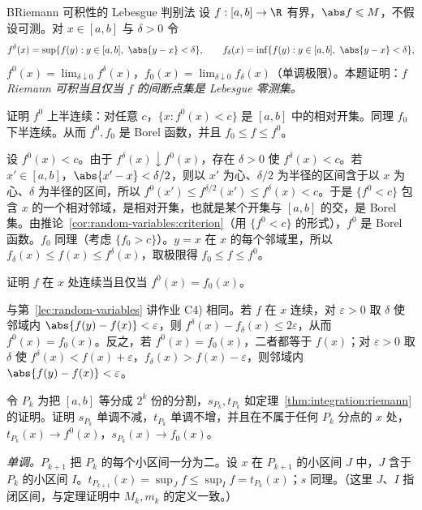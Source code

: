 \begin{probleme}{B}{Riemann 可积性的 Lebesgue 判别法}
设 $f:[a,b]\to\R$ 有界，$\abs f\leqslant M$，不假设可测。对 $x\in[a,b]$ 与 $\delta>0$ 令
\[
f^\delta(x)=\sup\{f(y):y\in[a,b],\ \abs{y-x}<\delta\},\qquad f_\delta(x)=\inf\{f(y):y\in[a,b],\ \abs{y-x}<\delta\},
\]
$f^0(x)=\lim_{\delta\downarrow0}f^\delta(x)$，$f_0(x)=\lim_{\delta\downarrow0}f_\delta(x)$（单调极限）。本题证明：\emph{$f$ Riemann 可积当且仅当 $f$ 的间断点集是 Lebesgue 零测集。}
\begin{questions}
\item 证明 $f^0$ 上半连续：对任意 $c$，$\{x:f^0(x)<c\}$ 是 $[a,b]$ 中的相对开集。同理 $f_0$ 下半连续。从而 $f^0,f_0$ 是 Borel 函数，并且 $f_0\leqslant f\leqslant f^0$。
\begin{solution}
设 $f^0(x)<c$。由于 $f^\delta(x)\downarrow f^0(x)$，存在 $\delta>0$ 使 $f^\delta(x)<c$。若 $x'\in[a,b]$，$\abs{x'-x}<\delta/2$，则以 $x'$ 为心、$\delta/2$ 为半径的区间含于以 $x$ 为心、$\delta$ 为半径的区间，所以 $f^0(x')\leqslant f^{\delta/2}(x')\leqslant f^\delta(x)<c$。于是 $\{f^0<c\}$ 包含 $x$ 的一个相对邻域，是相对开集，也就是某个开集与 $[a,b]$ 的交，是 Borel 集。由推论~\ref{cor:random-variables:criterion}（用 $\{f^0<c\}$ 的形式），$f^0$ 是 Borel 函数。$f_0$ 同理（考虑 $\{f_0>c\}$）。$y=x$ 在 $x$ 的每个邻域里，所以 $f_\delta(x)\leqslant f(x)\leqslant f^\delta(x)$，取极限得 $f_0\leqslant f\leqslant f^0$。
\end{solution}
\item 证明 $f$ 在 $x$ 处连续当且仅当 $f^0(x)=f_0(x)$。
\begin{solution}
与第~\ref{lec:random-variables} 讲作业 C4) 相同。若 $f$ 在 $x$ 连续，对 $\varepsilon>0$ 取 $\delta$ 使邻域内 $\abs{f(y)-f(x)}<\varepsilon$，则 $f^\delta(x)-f_\delta(x)\leqslant2\varepsilon$，从而 $f^0(x)=f_0(x)$。反之，若 $f^0(x)=f_0(x)$，二者都等于 $f(x)$；对 $\varepsilon>0$ 取 $\delta$ 使 $f^\delta(x)<f(x)+\varepsilon$，$f_\delta(x)>f(x)-\varepsilon$，则邻域内 $\abs{f(y)-f(x)}<\varepsilon$。
\end{solution}
\item 令 $P_k$ 为把 $[a,b]$ 等分成 $2^k$ 份的分割，$s_{P_k},t_{P_k}$ 如定理~\ref{thm:integration:riemann} 的证明。证明 $s_{P_k}$ 单调不减，$t_{P_k}$ 单调不增，并且在不属于任何 $P_k$ 分点的 $x$ 处，$t_{P_k}(x)\to f^0(x)$，$s_{P_k}(x)\to f_0(x)$。
\begin{solution}
\emph{单调。}$P_{k+1}$ 把 $P_k$ 的每个小区间一分为二。设 $x$ 在 $P_{k+1}$ 的小区间 $J$ 中，$J$ 含于 $P_k$ 的小区间 $I$。$t_{P_{k+1}}(x)=\sup_Jf\leqslant\sup_If=t_{P_k}(x)$；$s$ 同理。（这里 $J$、$I$ 指闭区间，与定理证明中 $M_k,m_k$ 的定义一致。）


\end{solution}
\end{questions}
\end{probleme}
